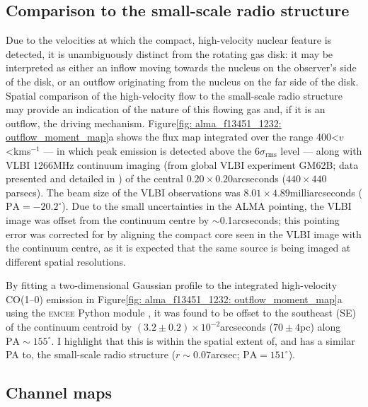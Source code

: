 \subsection{Comparison to the small-scale radio structure}
\label{section: alma_f13451_1232: analysis_and_results: radio_structure}

Due to the velocities at which the compact, high-velocity nuclear feature is detected, it is unambiguously distinct from the rotating gas disk: it may be interpreted as either an inflow moving towards the nucleus on the observer's side of the disk, or an outflow originating from the nucleus on the far side of the disk. Spatial comparison of the high-velocity flow to the small-scale radio structure may provide an indication of the nature of this flowing gas and, if it is an outflow, the driving mechanism. Figure\;\ref{fig: alma_f13451_1232: outflow_moment_map}a shows the flux map integrated over the range 400\;\textless\;$v$\;\textless{}\;km\;s$^{-1}$ --- in which peak emission is detected above the 6$\sigma_\mathrm{rms}$ level --- along with VLBI 1266\;MHz continuum imaging (from global VLBI experiment GM62B; data presented and detailed in \citealt{Morganti2013_4c1250}) of the central $0.20\times0.20$\;arcseconds ($440\times440$\;parsecs). The beam size of the VLBI observations was $8.01\times4.89$\;milliarcseconds ($\mathrm{PA}=-20.2^\circ$). Due to the small uncertainties in the ALMA pointing, the VLBI image was offset from the continuum centre by $\sim$0.1\;arcseconds; this pointing error was corrected for by aligning the compact core seen in the VLBI image with the continuum centre, as it is expected that the same source is being imaged at different spatial resolutions. 

By fitting a two-dimensional Gaussian profile to the integrated high-velocity CO(1--0) emission in Figure\;\ref{fig: alma_f13451_1232: outflow_moment_map}a using the \textsc{emcee} Python module \citep{FormanMackey2013}, it was found to be offset to the southeast (SE) of the continuum centroid by $(3.2\pm0.2)\times10^{-2}$\;arcseconds ($70\pm4$\;pc) along $\mathrm{PA}\sim155^{\circ}$. I highlight that this is within the spatial extent of, and has a similar PA to, the small-scale radio structure ($r\sim0.07$\;arcsec; $\mathrm{PA}=151^\circ$).


\subsection{Channel maps}
\label{section: alma_f13451_1232: analysis_and_results: channel_maps}

